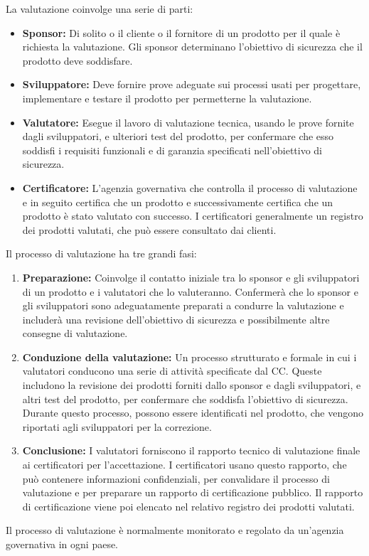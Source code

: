 La valutazione coinvolge una serie di parti:
\begin{itemize}
    \item \textbf{Sponsor:} Di solito o il cliente o il fornitore di un prodotto per il quale è richiesta la valutazione. Gli sponsor determinano l'obiettivo di sicurezza che il prodotto deve soddisfare.

    \item \textbf{Sviluppatore:} Deve fornire prove adeguate sui processi usati per progettare, implementare e testare il prodotto per permetterne la valutazione.

    \item \textbf{Valutatore:} Esegue il lavoro di valutazione tecnica, usando le prove fornite dagli sviluppatori, e ulteriori test del prodotto, per confermare che esso soddisfi i requisiti funzionali e di garanzia specificati nell'obiettivo di sicurezza.

    \item \textbf{Certificatore:} L'agenzia governativa che controlla il processo di valutazione e in seguito certifica che un prodotto e successivamente certifica che un prodotto è stato valutato con successo. I certificatori generalmente un registro dei prodotti valutati, che può essere consultato dai clienti.
\end{itemize}
Il processo di valutazione ha tre grandi fasi:
\begin{enumerate}
    \item \textbf{Preparazione:} Coinvolge il contatto iniziale tra lo sponsor e gli sviluppatori di un prodotto e i valutatori che lo valuteranno. Confermerà che lo sponsor e gli sviluppatori sono adeguatamente preparati a condurre la valutazione e includerà una revisione dell'obiettivo di sicurezza e possibilmente altre consegne di valutazione.
    
    \item \textbf{Conduzione della valutazione:} Un processo strutturato e formale in cui i valutatori conducono una serie di attività specificate dal CC. Queste includono la revisione dei prodotti forniti dallo sponsor e dagli sviluppatori, e altri test del prodotto, per confermare che soddisfa l'obiettivo di sicurezza. Durante questo processo, possono essere identificati nel prodotto, che vengono riportati agli sviluppatori per la correzione.
    
    \item \textbf{Conclusione:} I valutatori forniscono il rapporto tecnico di valutazione finale ai certificatori per l'accettazione. I certificatori usano questo rapporto, che può contenere informazioni confidenziali, per convalidare il processo di valutazione e per preparare un rapporto di certificazione pubblico. Il rapporto di certificazione viene poi elencato nel relativo registro dei prodotti valutati.

\end{enumerate}
Il processo di valutazione è normalmente monitorato e regolato da un'agenzia governativa in ogni paese.















